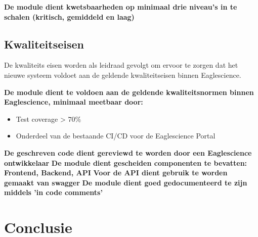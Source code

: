 \textbf{De module dient kwetsbaarheden op minimaal drie niveau’s in te schalen (kritisch, gemiddeld en laag)}

\subsection{Kwaliteitseisen}\label{subsec:kwaliteitseisen}
De kwaliteits eisen worden als leidraad gevolgt om ervoor te zorgen dat het nieuwe systeem voldoet aan de geldende kwaliteitseisen binnen Eaglescience.

\textbf{De module dient te voldoen aan de geldende kwaliteitsnormen binnen Eaglescience, minimaal meetbaar door:}
\begin{itemize}
    \item Test coverage > 70\%
    \item Onderdeel van de bestaande CI/CD voor de Eaglescience Portal
\end{itemize}
\textbf{De geschreven code dient gereviewd te worden door een Eaglescience ontwikkelaar}
\textbf{De module dient gescheiden componenten te bevatten: Frontend, Backend, API}
\textbf{Voor de API dient gebruik te worden gemaakt van swagger}
\textbf{De module dient goed gedocumenteerd te zijn middels 'in code comments'}


\section{Conclusie}\label{sec:conclusie}
